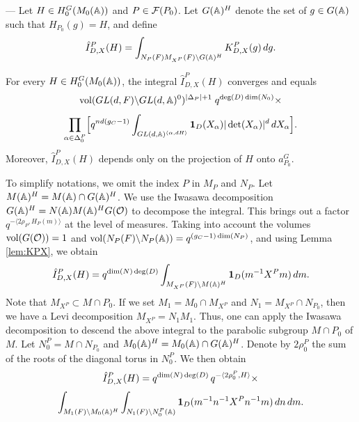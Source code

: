\begin{paragr} --- Let $H\in H_{0}^G(M_0(\mathbb{A}))$ and $P\in \mathcal{F}(P_0)$. Let $G(\mathbb{A})^{H}$ denote the set of $g\in G(\mathbb{A})$ such that $H_{P_0}(g)=H$, and define
\begin{equation}
    \label{eq:IcPDX}
    \hat{I}^P_{D,X}(H)= \int_{ N_P(F) M_{X^P}(F)\backslash G(\mathbb{A})^H} K_{D,X}^P(g)\,dg.
\end{equation}
  
\begin{lemme}\label{lem:calculIc}
For every $H\in H_{0}^G(M_0(\mathbb{A}))$, the integral $\hat{I}^P_{D,X}(H)$ converges and equals
$$\operatorname{vol}(GL(d,F)\backslash GL(d,\mathbb{A})^0)^{|\Delta_P|+1} \; q^{\deg(D)\dim(N_0)} \times$$
$$ \prod_{\alpha\in \Delta_0^P} \Bigl[  q^{nd(g_C-1)}  \int_{ GL(d,\mathbb{A})^{\langle \alpha,dH\rangle}}\mathbf{1}_D(X_\alpha)|\det(X_\alpha)|^d \, dX_\alpha\Bigr]. $$
Moreover, $\hat{I}^P_{D,X}(H)$ depends only on the projection of $H$ onto $a_{P_0}^G$.
\end{lemme}

\begin{preuve}
To simplify notations, we omit the index $P$ in $M_P$ and $N_P$. Let $M(\mathbb{A})^H=M(\mathbb{A})\cap G(\mathbb{A})^H$. We use the Iwasawa decomposition $G(\mathbb{A})^H=N(\mathbb{A})M(\mathbb{A})^H G(\mathcal{O})$ to decompose the integral. This brings out a factor $q^{-\langle 2\rho_P,H_P(m)\rangle}$ at the level of measures. Taking into account the volumes $\operatorname{vol}(G(\mathcal{O}))=1$ and $\operatorname{vol}(N_P(F)\backslash N_P(\mathbb{A}))=q^{(g_C-1)\dim(N_P)}$, and using Lemma \ref{lem:KPX}, we obtain 
$$\hat{I}^P_{D,X}(H)= q^{\dim(N)\deg(D)} \int_{ M_{X^P}(F)\backslash M(\mathbb{A})^H}  \mathbf{1}_{D}(m^{-1}X^P m) \, dm.$$
Note that $M_{X^P}\subset M\cap P_0$. If we set $M_1=M_0\cap M_{X^P}$ and $N_1=M_{X^P}\cap N_{P_0}$, then we have a Levi decomposition $M_{X^P}=N_1M_1$. Thus, one can apply the Iwasawa decomposition to descend the above integral to the parabolic subgroup $M\cap P_0$ of $M$. Let $N_0^P=M\cap N_{P_0}$ and $M_0(\mathbb{A})^H=M_0(\mathbb{A})\cap G(\mathbb{A})^H$. Denote by $2\rho_0^P$ the sum of the roots of the diagonal torus in $N_0^P$. We then obtain 
$$\hat{I}^P_{D,X}(H)=q^{\dim(N)\deg(D)}\, q^{-\langle 2\rho_0^P,H\rangle} \times $$
\begin{equation}
  \label{eq:privedeqN}
  \int_{M_1(F)\backslash M_0(\mathbb{A})^H} \int_{N_1(F)\backslash N_0^P(\mathbb{A})} \mathbf{1}_{D}(m^{-1} n^{-1}X^P n^{-1}m) \, dn\, dm.
\end{equation}


\end{preuve}
\end{paragr}
